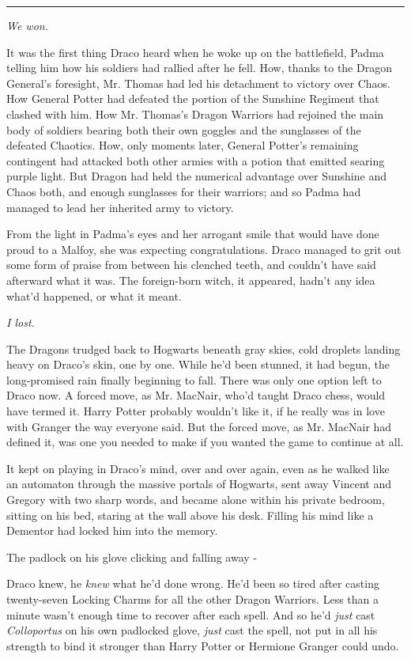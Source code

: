 \begin{center}\rule{3in}{0.4pt}\end{center}

\emph{We won.}

It was the first thing Draco heard when he woke up on the battlefield,
Padma telling him how his soldiers had rallied after he fell. How,
thanks to the Dragon General's foresight, Mr. Thomas had led his
detachment to victory over Chaos. How General Potter had defeated the
portion of the Sunshine Regiment that clashed with him. How Mr. Thomas's
Dragon Warriors had rejoined the main body of soldiers bearing both
their own goggles and the sunglasses of the defeated Chaotics. How, only
moments later, General Potter's remaining contingent had attacked both
other armies with a potion that emitted searing purple light. But Dragon
had held the numerical advantage over Sunshine and Chaos both, and
enough sunglasses for their warriors; and so Padma had managed to lead
her inherited army to victory.

From the light in Padma's eyes and her arrogant smile that would have
done proud to a Malfoy, she was expecting congratulations. Draco managed
to grit out some form of praise from between his clenched teeth, and
couldn't have said afterward what it was. The foreign-born witch, it
appeared, hadn't any idea what'd happened, or what it meant.

\emph{I lost.}

The Dragons trudged back to Hogwarts beneath gray skies, cold droplets
landing heavy on Draco's skin, one by one. While he'd been stunned, it
had begun, the long-promised rain finally beginning to fall. There was
only one option left to Draco now. A forced move, as Mr. MacNair, who'd
taught Draco chess, would have termed it. Harry Potter probably wouldn't
like it, if he really was in love with Granger the way everyone said.
But the forced move, as Mr. MacNair had defined it, was one you needed
to make if you wanted the game to continue at all.

It kept on playing in Draco's mind, over and over again, even as he
walked like an automaton through the massive portals of Hogwarts, sent
away Vincent and Gregory with two sharp words, and became alone within
his private bedroom, sitting on his bed, staring at the wall above his
desk. Filling his mind like a Dementor had locked him into the memory.

The padlock on his glove clicking and falling away -

Draco knew, he \emph{knew} what he'd done wrong. He'd been so tired
after casting twenty-seven Locking Charms for all the other Dragon
Warriors. Less than a minute wasn't enough time to recover after each
spell. And so he'd \emph{just} cast \emph{Colloportus} on his own
padlocked glove, \emph{just} cast the spell, not put in all his strength
to bind it stronger than Harry Potter or Hermione Granger could undo.

